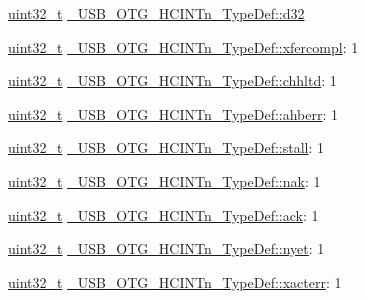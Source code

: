 \begin{DoxyCompactItemize}
\begin{tabbing}
\end{tabbing}\item 
\hyperlink{stdint_8h_a435d1572bf3f880d55459d9805097f62}{uint32\-\_\-t} \hyperlink{group___u_s_b___o_t_g___d_r_i_v_e_r_ga285318cfcab218b535f8a7bb06d685d1}{\-\_\-\-U\-S\-B\-\_\-\-O\-T\-G\-\_\-\-H\-C\-I\-N\-Tn\-\_\-\-Type\-Def\-::d32}
\item 
\hyperlink{stdint_8h_a435d1572bf3f880d55459d9805097f62}{uint32\-\_\-t} \hyperlink{group___u_s_b___o_t_g___d_r_i_v_e_r_ga25454c0ff096c325e8a0871e2d2e3f7e}{\-\_\-\-U\-S\-B\-\_\-\-O\-T\-G\-\_\-\-H\-C\-I\-N\-Tn\-\_\-\-Type\-Def\-::xfercompl}\-: 1
\item 
\hyperlink{stdint_8h_a435d1572bf3f880d55459d9805097f62}{uint32\-\_\-t} \hyperlink{group___u_s_b___o_t_g___d_r_i_v_e_r_gac58dedceee6dd7ac490b3c43823f1bc9}{\-\_\-\-U\-S\-B\-\_\-\-O\-T\-G\-\_\-\-H\-C\-I\-N\-Tn\-\_\-\-Type\-Def\-::chhltd}\-: 1
\item 
\hyperlink{stdint_8h_a435d1572bf3f880d55459d9805097f62}{uint32\-\_\-t} \hyperlink{group___u_s_b___o_t_g___d_r_i_v_e_r_ga05ee851a5de549e1e051f35f3e298971}{\-\_\-\-U\-S\-B\-\_\-\-O\-T\-G\-\_\-\-H\-C\-I\-N\-Tn\-\_\-\-Type\-Def\-::ahberr}\-: 1
\item 
\hyperlink{stdint_8h_a435d1572bf3f880d55459d9805097f62}{uint32\-\_\-t} \hyperlink{group___u_s_b___o_t_g___d_r_i_v_e_r_ga5601dd5d1afdbc91a1d023e031f200a6}{\-\_\-\-U\-S\-B\-\_\-\-O\-T\-G\-\_\-\-H\-C\-I\-N\-Tn\-\_\-\-Type\-Def\-::stall}\-: 1
\item 
\hyperlink{stdint_8h_a435d1572bf3f880d55459d9805097f62}{uint32\-\_\-t} \hyperlink{group___u_s_b___o_t_g___d_r_i_v_e_r_ga8d865899ab0f1404c53c7ce94dc84aea}{\-\_\-\-U\-S\-B\-\_\-\-O\-T\-G\-\_\-\-H\-C\-I\-N\-Tn\-\_\-\-Type\-Def\-::nak}\-: 1
\item 
\hyperlink{stdint_8h_a435d1572bf3f880d55459d9805097f62}{uint32\-\_\-t} \hyperlink{group___u_s_b___o_t_g___d_r_i_v_e_r_ga39f77ce791656afe942d9e317d40b507}{\-\_\-\-U\-S\-B\-\_\-\-O\-T\-G\-\_\-\-H\-C\-I\-N\-Tn\-\_\-\-Type\-Def\-::ack}\-: 1
\item 
\hyperlink{stdint_8h_a435d1572bf3f880d55459d9805097f62}{uint32\-\_\-t} \hyperlink{group___u_s_b___o_t_g___d_r_i_v_e_r_gac351ade1b77042f81f65ddd7595c9de3}{\-\_\-\-U\-S\-B\-\_\-\-O\-T\-G\-\_\-\-H\-C\-I\-N\-Tn\-\_\-\-Type\-Def\-::nyet}\-: 1
\item 
\hyperlink{stdint_8h_a435d1572bf3f880d55459d9805097f62}{uint32\-\_\-t} \hyperlink{group___u_s_b___o_t_g___d_r_i_v_e_r_ga75471b6f02970a40515aadb94078073c}{\-\_\-\-U\-S\-B\-\_\-\-O\-T\-G\-\_\-\-H\-C\-I\-N\-Tn\-\_\-\-Type\-Def\-::xacterr}\-: 1

\end{DoxyCompactItemize}
